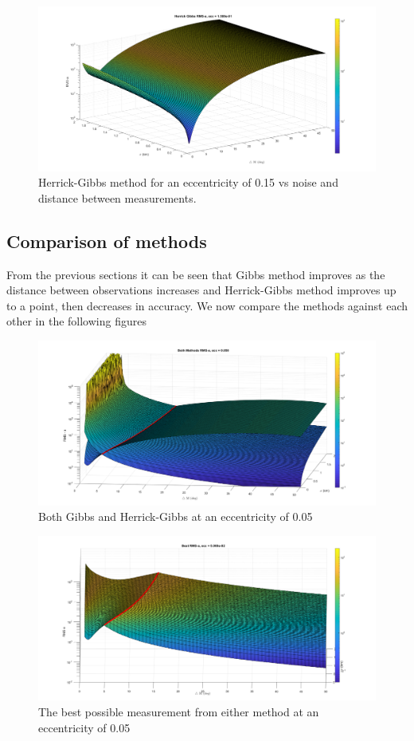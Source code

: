 \documentclass[12pt]{article}
\begin{document}
	\begin{figure}
		\centering
		\includegraphics[width=0.7\linewidth]{herrickgibbs_e_15}
		\caption{Herrick-Gibbs method for an eccentricity of 0.15 vs noise and distance between measurements.}
		\label{fig:herrickgibbse15}
	\end{figure}
	\subsection{Comparison of methods}
	
	From the previous sections it can be seen  that Gibbs method improves as the distance between observations increases and Herrick-Gibbs method improves up to a point, then decreases in accuracy. We now compare the methods against each other in the following figures 
	\begin{figure}
		\centering
		\includegraphics[width=0.7\linewidth]{bothMethods_e_05}
		\caption{Both Gibbs and Herrick-Gibbs at an eccentricity of 0.05}
		\label{fig:bothmethodse05}
	\end{figure}
	\begin{figure}
		\centering
		\includegraphics[width=0.7\linewidth]{bestMethods_e_05}
		\caption{The best possible measurement from either method at an eccentricity of 0.05}
		\label{fig:bestmethodse05}
	\end{figure}
\end{document}
